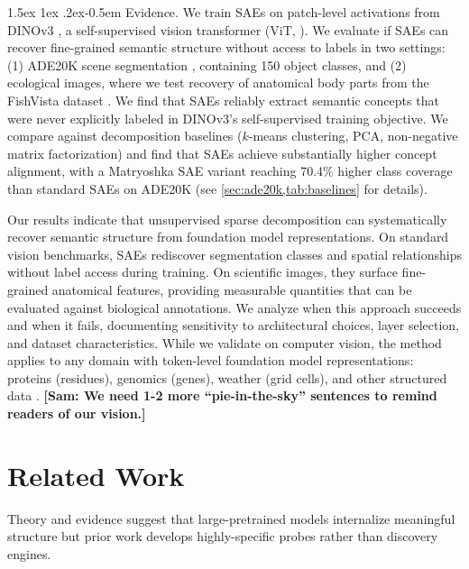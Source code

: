 \documentclass[10pt,twocolumn,letterpaper]{article}
\makeatletter
\newcommand{\sam}[1]{\textbf{\color{blue}[Sam: #1]}}
\renewcommand{\paragraph}{%
  \@startsection{paragraph}{4}%
  {\z@}{1.5ex \@plus 1ex \@minus .2ex}{-0.5em}%
  {\normalfont\normalsize\bfseries}%
}
\makeatother
\begin{document}
\paragraph{Evidence.}
We train SAEs on patch-level activations from DINOv3 \citep{simeoni2025dinov3}, a self-supervised vision transformer (ViT, \cite{dosovitskiy2020vit}).
We evaluate if SAEs can recover fine-grained semantic structure without access to labels in two settings: (1) ADE20K scene segmentation \citep{zhou2017ade20k}, containing 150 object classes, and (2) ecological images, where we test recovery of anatomical body parts from the FishVista dataset \citep{mehrab2024fishvista,fishvistadataset}.
We find that SAEs reliably extract semantic concepts that were never explicitly labeled in DINOv3's self-supervised training objective.
We compare against decomposition baselines ($k$-means clustering, PCA, non-negative matrix factorization) and find that SAEs achieve substantially higher concept alignment, with a Matryoshka SAE variant \citep{bussmann2025matryoshka} reaching \num{70.4}\% higher class coverage than standard SAEs on ADE20K (see \cref{sec:ade20k,tab:baselines} for details).

Our results indicate that unsupervised sparse decomposition can systematically recover semantic structure from foundation model representations.
On standard vision benchmarks, SAEs rediscover segmentation classes and spatial relationships without label access during training.
On scientific images, they surface fine-grained anatomical features, providing measurable quantities that can be evaluated against biological annotations.
We analyze when this approach succeeds and when it fails, documenting sensitivity to architectural choices, layer selection, and dataset characteristics.
While we validate on computer vision, the method applies to any domain with token-level foundation model representations: proteins (residues), genomics (genes), weather (grid cells), and other structured data \citep{abramson2024alphafold3,lam2023graphcast,cui2024scgpt}.
\sam{We need 1-2 more ``pie-in-the-sky'' sentences to remind readers of our vision.}

\section{Related Work}

Theory and evidence suggest that large-pretrained models internalize meaningful structure \citep{ha2018world,caron2021dinov1,lecun2022jepa,huh2024platonic} but prior work develops highly-specific probes rather than discovery engines.
\end{document}
